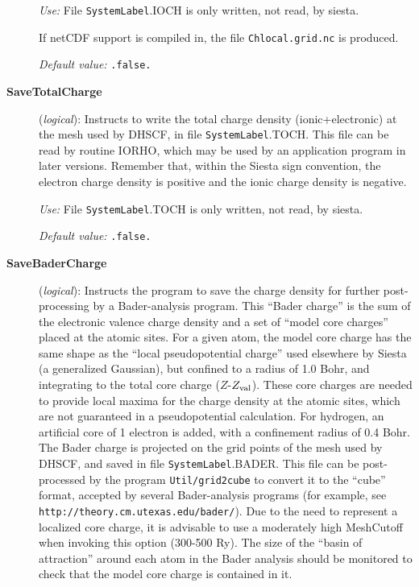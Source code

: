 \documentclass[11pt]{article}
\begin{document}
\begin{description}
{\it Use:} File {\tt SystemLabel}.IOCH is only written, not read, by siesta.

If netCDF support is compiled in, the file {\tt Chlocal.grid.nc} is produced.

{\it Default value:} {\tt .false.}

\item[{\bf SaveTotalCharge}] ({\it logical}):
Instructs to write the total charge density (ionic+electronic) at the
mesh used by DHSCF,
in file {\tt SystemLabel}.TOCH. This file can be read by routine IORHO,
which may be used by an application program in later versions.
Remember that, within the {\sc Siesta} sign convention, the electron charge
density is positive and the ionic charge density is negative.

{\it Use:} File {\tt SystemLabel}.TOCH is only written, not read, by siesta.

{\it Default value:} {\tt .false.}

\item[{\bf SaveBaderCharge}] ({\it logical}):
    Instructs the program to save the charge density for
  further post-processing by a Bader-analysis program.  This ``Bader
  charge'' is the sum of the electronic valence charge density and a
  set of ``model core charges'' placed at the atomic sites. For a
  given atom, the model core charge has the same shape as the ``local
  pseudopotential charge'' used elsewhere by {\sc Siesta} (a
  generalized Gaussian), but confined to a radius of 1.0 Bohr, and
  integrating to the total core charge ($Z$-$Z_{\rm val}$). These core
  charges are needed to provide local maxima for the charge density at
  the atomic sites, which are not guaranteed in a pseudopotential
  calculation. For hydrogen, an artificial core of 1 electron is
  added, with a confinement radius of 0.4 Bohr.  The Bader charge is
  projected on the grid points of the mesh used by DHSCF, and saved in
  file {\tt SystemLabel}.BADER. This file can be post-processed by the
  program {\tt Util/grid2cube} to convert it to the ``cube'' format,
  accepted by several Bader-analysis programs (for example, see {\tt
    http://theory.cm.utexas.edu/bader/}).  Due to the need to
  represent a localized core charge, it is advisable to use a
  moderately high MeshCutoff when invoking this option (300-500
  Ry). The size of the ``basin of attraction'' around each atom in the
  Bader analysis should be monitored to check that the model core
  charge is contained in it.  


\end{description}
\end{document}
